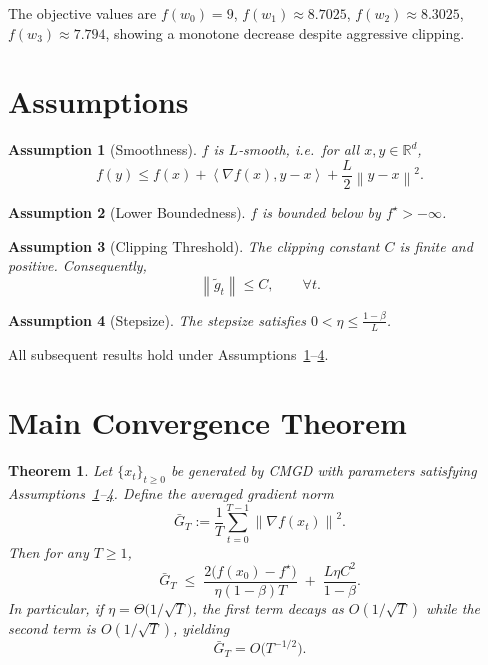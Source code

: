 \documentclass{article}
\newtheorem{theorem}{Theorem}
\newtheorem{assumption}{Assumption}
\newcommand{\norm}[1]{\left\lVert#1\right\rVert}
\newcommand{\inner}[2]{\left\langle #1,#2\right\rangle}
\begin{document}
The objective values are
$f(w_{0})=9$, $f(w_{1})\approx 8.7025$, $f(w_{2})\approx 8.3025$,
$f(w_{3})\approx 7.794$,
showing a monotone decrease despite aggressive clipping.

\newpage
\section*{Assumptions}
\begin{assumption}[Smoothness]\label{ass:smooth}
$f$ is $L$‑smooth, i.e.\ for all $x,y\in\mathbb{R}^{d}$,
\[
f(y)\le f(x)+\inner{\nabla f(x)}{y-x}+\frac{L}{2}\norm{y-x}^{2}.
\]
\end{assumption}
\begin{assumption}[Lower Boundedness]\label{ass:bound}
$f$ is bounded below by $f^{\star}>-\infty$.
\end{assumption}
\begin{assumption}[Clipping Threshold]\label{ass:clip}
The clipping constant $C$ is finite and positive. Consequently,
\[
\norm{\tilde g_{t}}\le C,\qquad\forall t. \tag{5}
\]
\end{assumption}
\begin{assumption}[Stepsize]\label{ass:stepsize}
The stepsize satisfies $0<\eta\le \frac{1-\beta}{L}$.
\end{assumption}
All subsequent results hold under Assumptions~\ref{ass:smooth}–\ref{ass:stepsize}.

\section*{Main Convergence Theorem}
\begin{theorem}\label{thm:main}
Let $\{x_{t}\}_{t\ge0}$ be generated by CMGD with parameters satisfying
Assumptions~\ref{ass:smooth}–\ref{ass:stepsize}.  Define the averaged
gradient norm
\[
\bar G_{T}:=\frac{1}{T}\sum_{t=0}^{T-1}\norm{\nabla f(x_{t})}^{2}.
\]
Then for any $T\ge1$,
\[
\bar G_{T}\;\le\;
\frac{2\bigl(f(x_{0})-f^{\star}\bigr)}{\eta(1-\beta)T}
\;+\;
\frac{L\eta C^{2}}{1-\beta}. \tag{6}
\]
In particular, if $\eta =\Theta\!\bigl(1/\sqrt{T}\bigr)$,
the first term decays as $O(1/\sqrt{T})$ while the second term is $O(1/\sqrt{T})$,
yielding
\[
\bar G_{T}=O\!\bigl(T^{-1/2}\bigr).
\]
\end{theorem}
\end{document}

